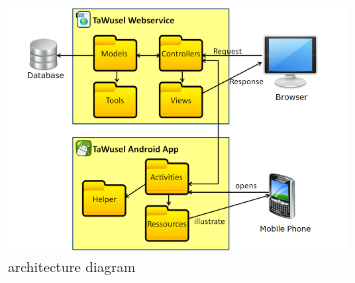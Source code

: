 \begin{figure}[h]
	\centering
	\includegraphics[width=0.8\textwidth]{images/Architekturdiagramm}
	\caption{architecture diagram}
	\label{img:Arch}
\end{figure}

